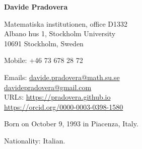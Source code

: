 \documentclass[11pt]{article} %
\begin{document}

\begin{minipage}[c]{.75\textwidth}
{\huge\bfseries Davide Pradovera} %
\bigskip\bigskip\medskip %

Matematiska institutionen, office D1332 \\
Albano hus 1, Stockholm University \\
10691 Stockholm, Sweden
\medskip %

Mobile: +46 73 678 28 72 %
\medskip %

Emails: \href{mailto:davide.pradovera@math.su.se}{davide.pradovera@math.su.se}\\ %
\phantom{Emails: }\href{mailto:davidepradovera@gmail.com}{davidepradovera@gmail.com}\\ %
\textsc{URLs}: \href{https://pradovera.github.io}{https://pradovera.github.io}\\ %
\href{https://orcid.org/0000-0003-0398-1580}{https://orcid.org/0000-0003-0398-1580}\\ %
\end{minipage}\hfill%
\begin{minipage}[c]{.225\textwidth}
\end{minipage}\hfill%

\smallskip %


Born on October 9, 1993 in Piacenza, Italy. %

Nationality: Italian. %
\end{document}
